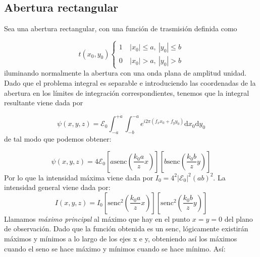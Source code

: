 \documentclass[12pt,a4paper]{book}
\numberwithin{equation}{section}
\numberwithin{figure}{section}
\newcommand{\parentesis}[1]{\left( #1  \right)}
\newcommand{\ccorchetes}[1]{\left[ #1  \right]}
\newcommand{\D}{\mathrm{d}}
\newcommand{\1}{_{(1)}}
\newcommand{\2}{_{(2)}}
\newcommand{\sinc}{\mathrm{senc} }
\newcommand{\Ecal}{\mathcal{E}}
\theoremstyle{definition}
\begin{document}
\subsection{Abertura rectangular}

Sea una abertura rectangular, con una función de trasmisión definida como


\begin{equation}
    t(x_0,y_0) \left\lbrace
    \begin{array}{ll}
        1 \ & |x_0|\leq a, \ |y_0|\leq b  \\
        0 \ & |x_0|> a, \ |y_0|>b
    \end{array}
    \right.
\end{equation}
iluminando normalmente la abertura con una onda plana de amplitud unidad. Dado que el problema integral es separable e introduciendo las coordenadas de la abertura en los límites de integración correspondientes, tenemos que la integral resultante viene dada por

\begin{equation}
    \psi (x,y,z) = \Ecal_0 \int_{-a}^{+a} \int_{-b}^{-a} e^{i2\pi(f_xx_0+f_yy_0)} \D x_0 \D y_0
\end{equation}
de tal modo que podemos obtener:

\begin{equation}
    \psi (x,y,z) = 4 \Ecal_0 \ccorchetes{a \sinc \parentesis{\frac{k_0 a}{z}x}}  \ccorchetes{b \sinc \parentesis{\frac{k_0 b}{z}y}}\label{Ec:07.2-03}
\end{equation}
Por lo que la intensidad máxima viene dada por $I_0 = 4^2 |\Ecal_0|^2 (ab)^2$. La intensidad general viene dada por: 
\begin{equation}
    I (x,y,z) =I_0 \ccorchetes{\sinc^2 \parentesis{\frac{k_0 a}{z}x}}  \ccorchetes{ \sinc^2 \parentesis{\frac{k_0 b}{z}y}} \label{Ec:07.2-04}
\end{equation}
Llamamos \textit{máximo principal} al máximo que hay en el punto $x=y=0$ del plano de observación. Dado que la función obtenida es un senc, lógicamente existirán máximos y mínimos a lo largo de los ejes x e y, obteniendo así los máximos cuando el seno se hace máximo y mínimos cuando se hace mínimo. Así:
\end{document}
